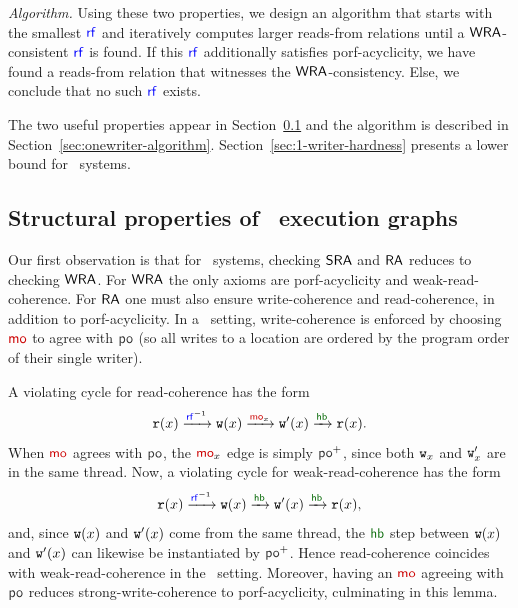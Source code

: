 \noindent \textit{Algorithm.} Using these two properties, we design an algorithm that starts with the smallest $\rf$ and iteratively computes larger reads-from relations until a $\mathsf{WRA}$-consistent $\rf$ is found. If this $\rf$ additionally satisfies porf-acyclicity, we have found a reads-from relation that witnesses the $\mathsf{WRA}$-consistency. Else, we conclude that no such $\rf$ exists.  

The two useful properties appear in Section~\ref{sec:onewriter-structural-properties} and the algorithm is described in Section~\ref{sec:onewriter-algorithm}. Section~\ref{sec:1-writer-hardness} presents a lower bound for \onewriter\ systems.

\subsection{Structural properties of \onewriter\ execution graphs}
\label{sec:onewriter-structural-properties}
Our first observation is that for \onewriter\ systems, checking $\mathsf{SRA}$ and $\mathsf{RA}$ reduces to checking $\mathsf{WRA}$.  For $\mathsf{WRA}$ the only axioms are porf-acyclicity and weak-read-coherence.  For $\mathsf{RA}$ one must also ensure write-coherence and read-coherence, in addition to porf-acyclicity.  In a \onewriter\ setting, write-coherence is enforced by choosing $\mo$ to agree with $\po$ (so all writes to a location are ordered by the program order of their single writer).  

A violating cycle for read-coherence has the form
\[
\rd(x) \xra{\rf^{-1}} \wt(x) \xra{\mo_x} \wt'(x) \xra{\hb} \rd(x).
\]
When $\mo$ agrees with $\po$, the $\mo_x$ edge is simply $\po^+$, since both $\mathtt{w}_x$ and $\mathtt{w}'_x$ are in the same thread. Now, a violating cycle for weak-read-coherence has the form
\[
\rd(x) \xra{\rf^{-1}} \wt(x) \xra{\hb} \wt'(x) \xra{\hb} \rd(x),
\]
and, since $\mathtt{w}(x)$ and $\mathtt{w}'(x)$ come from the same thread, the $\hb$ step between $\mathtt{w}(x)$ and $\mathtt{w}'(x)$ can likewise be instantiated by $\po^+$.  Hence read-coherence coincides with weak-read-coherence in the \onewriter\ setting.  Moreover, having an $\mo$ agreeing with $\po$ reduces strong-write-coherence to porf-acyclicity, culminating in this lemma.  

